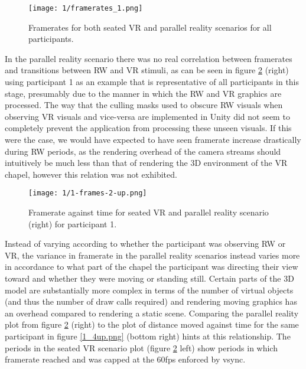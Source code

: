 \begin{figure}[ht]
	\begin{center}
		\texttt{[image: 1/framerates\_1.png]}
		\caption{Framerates for both seated VR and parallel reality scenarios for all participants.}
		\label{framerates_1.png}
	\end{center}
\end{figure}

In the parallel reality scenario there was no real correlation between framerates and transitions between RW and VR stimuli, as can be seen in figure \ref{1-frames-2-up.png} (right) using participant 1 as an example that is representative of all participants in this stage, presumably due to the manner in which the RW and VR graphics are processed. The way that the culling masks used to obscure RW visuals when observing VR visuals and vice-versa are implemented in Unity did not seem to completely prevent the application from processing these unseen visuals. If this were the case, we would have expected to have seen framerate increase drastically during RW periods, as the rendering overhead of the camera streams should intuitively be much less than that of rendering the 3D environment of the VR chapel, however this relation was not exhibited.

\begin{figure}[ht]
	\begin{center}
		\texttt{[image: 1/1-frames-2-up.png]}
		\caption{Framerate against time for seated VR and parallel reality scenario (right) for participant 1.}
		\label{1-frames-2-up.png}
	\end{center}
\end{figure}

Instead of varying according to whether the participant was observing RW or VR, the variance in framerate in the parallel reality scenarios instead varies more in accordance to what part of the chapel the participant was directing their view toward and whether they were moving or standing still. Certain parts of the 3D model are substantially more complex in terms of the number of virtual objects (and thus the number of draw calls required) and rendering moving graphics has an overhead compared to rendering a static scene. Comparing the parallel reality plot from figure \ref{1-frames-2-up.png} (right) to the plot of distance moved against time for the same participant in figure \ref{1_4up.png} (bottom right) hints at this relationship. The periods in the seated VR scenario plot (figure \ref{1-frames-2-up.png} left) show periods in which framerate reached and was capped at the 60fps enforced by vsync.

